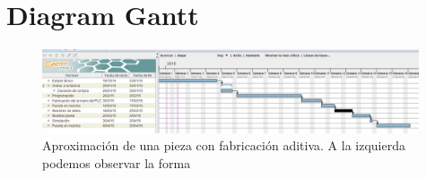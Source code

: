 \chapter{Diagram Gantt}
\label{ane:gant}

%
\begin{figure}[!ht]
    \centering
    \includegraphics[width=0.99\textwidth]{images/gantt.png}
    \caption[Aproximación de una pieza con fabricación aditiva.]{Aproximación de una pieza con fabricación aditiva. A la izquierda podemos observar la forma}
    \label{fig:gantt}
\end{figure}